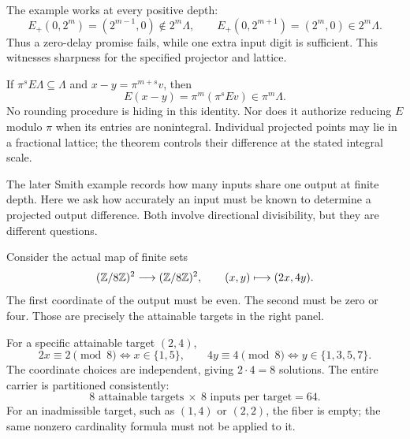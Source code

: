 
The example works at every positive depth:
\[
E_+(0,2^m)=(2^{m-1},0)\notin2^m\Lambda,
\qquad
E_+(0,2^{m+1})=(2^m,0)\in2^m\Lambda.
\]
Thus a zero-delay promise fails, while one extra input digit is sufficient. This witnesses sharpness for the specified projector and lattice.

If $\pi^sE\Lambda\subseteq\Lambda$ and $x-y=\pi^{m+s}v$, then
\[
E(x-y)=\pi^m(\pi^sEv)\in\pi^m\Lambda.
\]
No rounding procedure is hiding in this identity. Nor does it authorize reducing $E$ modulo $\pi$ when its entries are nonintegral. Individual projected points may lie in a fractional lattice; the theorem controls their difference at the stated integral scale.

The later Smith example records how many inputs share one output at finite depth. Here we ask how accurately an input must be known to determine a projected output difference. Both involve directional divisibility, but they are different questions.


Consider the actual map of finite sets
\[
(\mathbb Z/8\mathbb Z)^2\longrightarrow(\mathbb Z/8\mathbb Z)^2,
\qquad (x,y)\longmapsto(2x,4y).
\]
The first coordinate of the output must be even. The second must be zero or four. Those are precisely the attainable targets in the right panel.


For a specific attainable target $(2,4)$,
\[
2x\equiv2\pmod8\iff x\in\{1,5\},\qquad
4y\equiv4\pmod8\iff y\in\{1,3,5,7\}.
\]
The coordinate choices are independent, giving $2\cdot4=8$ solutions. The entire carrier is partitioned consistently:
\[
8\text{ attainable targets}\ \times\ 8\text{ inputs per target}=64.
\]
For an inadmissible target, such as $(1,4)$ or $(2,2)$, the fiber is empty; the same nonzero cardinality formula must not be applied to it.

